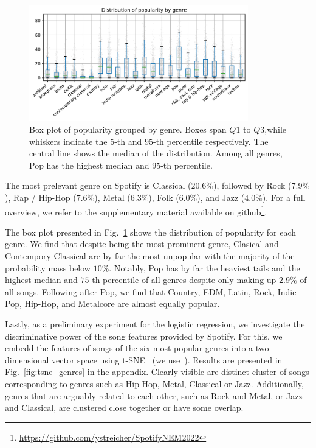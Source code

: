 \documentclass{article}
\begin{document}
\begin{figure}
  \centering
  \includegraphics[width=0.85\textwidth]{../figures/popularity_distribution_by_genre.pdf}
  \caption{Box plot of popularity grouped by genre. Boxes span $Q1$ to $Q3$,while whiskers indicate the $5$-th and $95$-th percentile respectively. The central line shows the median of the distribution. Among all genres, Pop has the highest median and $95$-th percentile.}
  \label{fig:genre_boxplot}
\end{figure}

The most prelevant genre on Spotify is Classical ($20.6\%$), followed by Rock ($7.9\%$), Rap / Hip-Hop ($7.6\%$), Metal ($6.3\%$), Folk ($6.0\%$), and Jazz ($4.0\%$). For a full overview, we refer to the supplementary material available on github\footnote{\url{https://github.com/ystreicher/SpotifyNEM2022}}.

The box plot presented in Fig.~\ref{fig:genre_boxplot} shows the distribution of popularity for each genre. We find that despite  being the most prominent genre, Clasical and Contempory Classical are by far the most unpopular with the majority of the probability mass below $10\%$. Notably, Pop has by far the heaviest tails and the highest median and $75$-th percentile of all genres despite only making up $2.9\%$ of all songs. Following after Pop, we find that Country, EDM, Latin, Rock, Indie Pop, Hip-Hop, and Metalcore are almost equally popular.  

Lastly, as a preliminary experiment for the logistic regression, we investigate the discriminative power of the song features provided by Spotify. For this, we embedd the features of songs of the six most popular genres into a two-dimensional vector space using t-SNE~\cite{van2008visualizing} (we use~\cite{Policar731877}). Results are presented in Fig.~\ref{fig:tsne_genres} in the appendix. Clearly visible are distinct cluster of songs corresponding to genres such as Hip-Hop, Metal, Classical or Jazz. Additionally, genres that are arguably related to each other, such as Rock and Metal, or Jazz and Classical, are clustered close together or have some overlap.
\end{document}
